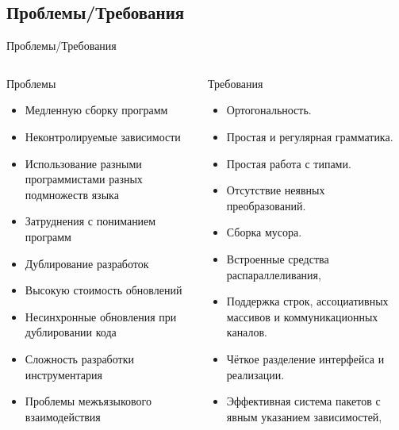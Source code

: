 \subsection{Проблемы/Требования}
\begin{frame}{Проблемы/Требования}
    \begin{columns}
    \footnotesize
    \begin{alertblock}{Проблемы}
    \centering
    {
    \begin{itemize}
        \item Медленную сборку программ
        \item Неконтролируемые зависимости
        \item Использование разными программистами разных подмножеств языка
        \item Затруднения с пониманием программ %
        \item Дублирование разработок
        \item Высокую стоимость обновлений
        \item Несинхронные обновления при дублировании кода
        \item Сложность разработки инструментария
        \item Проблемы межъязыкового взаимодействия
    \end{itemize}
    }
    \end{alertblock}
    \begin{exampleblock}{Требования}
    \centering
    {
    \begin{itemize}
        \item Ортогональность.%
        \item Простая и регулярная грамматика.%
        \item Простая работа с типами.%
        \item Отсутствие неявных преобразований.
        \item Сборка мусора.
        \item Встроенные средства распараллеливания,%
        \item Поддержка строк, ассоциативных массивов и коммуникационных каналов.
        \item Чёткое разделение интерфейса и реализации.
        \item Эффективная система пакетов с явным указанием зависимостей,%
    \end{itemize}
    }
    \end{exampleblock}
    \end{columns}
\end{frame}
